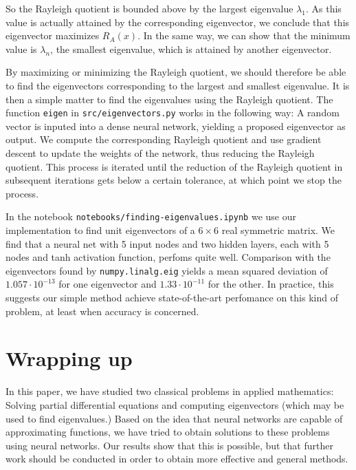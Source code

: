 \documentclass{article}
\begin{document}
So the Rayleigh quotient is bounded above by the largest eigenvalue $\lambda_1$. As this value is actually attained by the corresponding eigenvector, we conclude that this eigenvector maximizes $R_A (x)$. In the same way, we can show that the minimum value is $\lambda_n$, the smallest eigenvalue, which is attained by another eigenvector.

By maximizing or minimizing the Rayleigh quotient, we should therefore be able to find the eigenvectors corresponding to the largest and smallest eigenvalue. It is then a simple matter to find the eigenvalues using the Rayleigh quotient. The function \texttt{eigen} in \texttt{src/eigenvectors.py} works in the following way: A random vector is inputed into a dense neural network, yielding a proposed eigenvector as output. We compute the corresponding Rayleigh quotient and use gradient descent to update the weights of the network, thus reducing the Rayleigh quotient. This process is iterated until the reduction of the Rayleigh quotient in subsequent iterations gets below a certain tolerance, at which point we stop the process.

In the notebook \texttt{notebooks/finding-eigenvalues.ipynb} we use our implementation to find unit eigenvectors of a $6 \times 6$ real symmetric matrix. We find that a neural net with 5 input nodes and two hidden layers, each with 5 nodes and tanh activation function, perfoms quite well. Comparison with the eigenvectors found by \texttt{numpy.linalg.eig} yields a mean squared deviation of $1.057 \cdot 10^{-13}$ for one eigenvector and $1.33 \cdot10^{-11}$ for the other. In practice, this suggests our simple method achieve state-of-the-art perfomance on this kind of problem, at least when accuracy is concerned.

\section{Wrapping up}
In this paper, we have studied two classical problems in applied mathematics: Solving partial differential equations and computing eigenvectors (which may be used to find eigenvalues.) Based on the idea that neural networks are capable of approximating functions, we have tried to obtain solutions to these problems using neural networks. Our results show that this is possible, but that further work should be conducted in order to obtain more effective and general methods.
\end{document}
